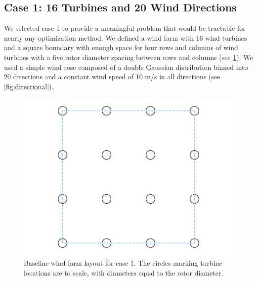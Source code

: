 \documentclass[hidelinks,sort&compress,AMA,STIX1COL]{WileyNJD-v2}
\providecommand{\DIFaddbeginFL}{} %
\providecommand{\DIFaddendFL}{} %
\providecommand{\DIFdelbeginFL}{} %
\providecommand{\DIFdelendFL}{} %
\newcommand{\DIFscaledelfig}{0.5}
\newlength{\DIFdelgraphicswidth} %
\newlength{\DIFdelgraphicsheight} %
\newcommand{\DIFaddincludegraphics}[2][]{{\color{blue}\fbox{\DIFOincludegraphics[#1]{#2}}}} %
\newcommand{\DIFdelincludegraphics}[2][]{%
\sbox{\DIFdelgraphicsbox}{\DIFOincludegraphics[#1]{#2}}%
\settoboxwidth{\DIFdelgraphicswidth}{\DIFdelgraphicsbox} %
\settoboxtotalheight{\DIFdelgraphicsheight}{\DIFdelgraphicsbox} %
\scalebox{\DIFscaledelfig}{%
\parbox[b]{\DIFdelgraphicswidth}{\usebox{\DIFdelgraphicsbox}\\[-\baselineskip] \rule{\DIFdelgraphicswidth}{0em}}\llap{\resizebox{\DIFdelgraphicswidth}{\DIFdelgraphicsheight}{%
\setlength{\unitlength}{\DIFdelgraphicswidth}%
\begin{picture}(1,1)%
\thicklines\linethickness{2pt} %
{\color[rgb]{1,0,0}\put(0,0){\framebox(1,1){}}}%
{\color[rgb]{1,0,0}\put(0,0){\line( 1,1){1}}}%
{\color[rgb]{1,0,0}\put(0,1){\line(1,-1){1}}}%
\end{picture}%
}\hspace*{3pt}}} %
} %
\DeclareRobustCommand{\DIFaddbeginFL}{\DIFOaddbeginFL \let\includegraphics\DIFaddincludegraphics} %
\DeclareRobustCommand{\DIFaddendFL}{\DIFOaddendFL \let\includegraphics\DIFOincludegraphics} %
\DeclareRobustCommand{\DIFdelbeginFL}{\DIFOdelbeginFL \let\includegraphics\DIFdelincludegraphics} %
\DeclareRobustCommand{\DIFdelendFL}{\DIFOaddendFL \let\includegraphics\DIFOincludegraphics} %
\begin{document}
\subsection{Case 1: 16 Turbines and 20 Wind Directions}
We selected case 1 to provide a meaningful problem that would be tractable for nearly any optimization method. We defined a wind farm with 16 wind turbines and a square boundary with enough space for four rows and columns of wind turbines with a five rotor diameter spacing between rows and columns (see \cref{fig:layout1}). We used a simple wind rose composed of a double Gaussian distribution binned into 20 directions and a constant wind speed of 10 m/s in all directions (see \cref{fig:directional}).
\begin{figure}[h!]
\centering
\begin{minipage}[t]{18pc}
\centering
\DIFdelbeginFL %
\DIFdelendFL \DIFaddbeginFL \includegraphics[width=1.\textwidth, trim={1.5cm, 0cm, 1.5cm, 0cm}, clip]{final_images/layouts/Figure_8}
\DIFaddendFL \caption{Baseline wind farm layout for case 1. The circles marking turbine locations are to scale, with diameters equal to the rotor diameter.}
\label{fig:layout1}
\end{minipage}\hspace{1pc}%
\begin{minipage}[t]{18pc}
\centering
\DIFdelbeginFL %

\end{minipage}
\end{figure}
\end{document}

